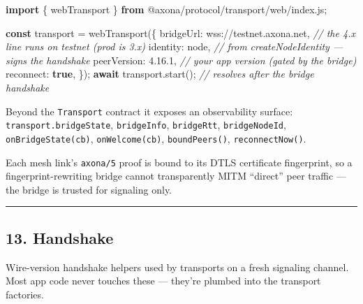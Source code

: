 \documentclass[
  nobib]{tufte-handout}
\newenvironment{Shaded}{}{}
\newcommand{\CommentTok}[1]{\textcolor[rgb]{0.38,0.63,0.69}{\textit{#1}}}
\newcommand{\ControlFlowTok}[1]{\textcolor[rgb]{0.00,0.44,0.13}{\textbf{#1}}}
\newcommand{\DataTypeTok}[1]{\textcolor[rgb]{0.56,0.13,0.00}{#1}}
\newcommand{\FunctionTok}[1]{\textcolor[rgb]{0.02,0.16,0.49}{#1}}
\newcommand{\ImportTok}[1]{\textcolor[rgb]{0.00,0.50,0.00}{\textbf{#1}}}
\newcommand{\KeywordTok}[1]{\textcolor[rgb]{0.00,0.44,0.13}{\textbf{#1}}}
\newcommand{\NormalTok}[1]{#1}
\newcommand{\OperatorTok}[1]{\textcolor[rgb]{0.40,0.40,0.40}{#1}}
\newcommand{\StringTok}[1]{\textcolor[rgb]{0.25,0.44,0.63}{#1}}
\begin{document}
\begin{Shaded}
\begin{Highlighting}[]
\ImportTok{import}\NormalTok{ \{ webTransport \} }\ImportTok{from} \StringTok{\textquotesingle{}@axona/protocol/transport/web/index.js\textquotesingle{}}\OperatorTok{;}

\KeywordTok{const}\NormalTok{ transport }\OperatorTok{=} \FunctionTok{webTransport}\NormalTok{(\{}
  \DataTypeTok{bridgeUrl}\OperatorTok{:}   \StringTok{\textquotesingle{}wss://testnet.axona.net\textquotesingle{}}\OperatorTok{,}  \CommentTok{// the 4.x line runs on testnet (prod is 3.x)}
  \DataTypeTok{identity}\OperatorTok{:}\NormalTok{    node}\OperatorTok{,}                       \CommentTok{// from createNodeIdentity — signs the handshake}
  \DataTypeTok{peerVersion}\OperatorTok{:} \StringTok{\textquotesingle{}4.16.1\textquotesingle{}}\OperatorTok{,}                   \CommentTok{// your app version (gated by the bridge)}
  \DataTypeTok{reconnect}\OperatorTok{:}   \KeywordTok{true}\OperatorTok{,}
\NormalTok{\})}\OperatorTok{;}
\ControlFlowTok{await}\NormalTok{ transport}\OperatorTok{.}\FunctionTok{start}\NormalTok{()}\OperatorTok{;}                  \CommentTok{// resolves after the bridge handshake}
\end{Highlighting}
\end{Shaded}

Beyond the \texttt{Transport} contract it exposes an observability
surface: \texttt{transport.bridgeState}, \texttt{bridgeInfo},
\texttt{bridgeRtt}, \texttt{bridgeNodeId}, \texttt{onBridgeState(cb)},
\texttt{onWelcome(cb)}, \texttt{boundPeers()}, \texttt{reconnectNow()}.

Each mesh link's \texttt{axona/5} proof is bound to its DTLS certificate
fingerprint, so a fingerprint-rewriting bridge cannot transparently MITM
``direct'' peer traffic --- the bridge is trusted for signaling only.

\begin{center}\rule{0.5\linewidth}{0.5pt}\end{center}

\subsection{13. Handshake}\label{handshake}

Wire-version handshake helpers used by transports on a fresh signaling
channel. Most app code never touches these --- they're plumbed into the
transport factories.
\end{document}
